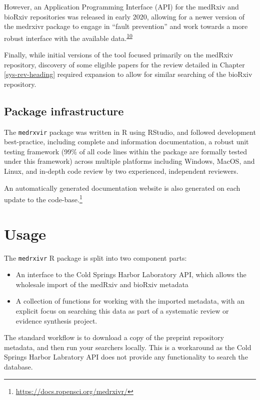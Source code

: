 \documentclass[a4paper, twoside]{templates/ociamthesis}
\providecommand{\tightlist}{%
  \setlength{\itemsep}{0pt}\setlength{\parskip}{0pt}}
\begin{document}
However, an Application Programming Interface (API) for the medRxiv and bioRxiv repositories was released in early 2020, allowing for a newer version of the medrxivr package to engage in ``fault prevention'' and work towards a more robust interface with the available data.\textsuperscript{\protect\hyperlink{ref-laprie1992}{10}}

Finally, while initial versions of the tool focused primarily on the medRxiv repository, discovery of some eligible papers for the review detailed in Chapter \ref{sys-rev-heading} required expansion to allow for similar searching of the bioRxiv repository.

\hypertarget{package-infrastructure}{%
\subsection{Package infrastructure}\label{package-infrastructure}}

The \texttt{medrxvir} package was written in R using RStudio, and followed development best-practice, including complete and information documentation, a robust unit testing framework (99\% of all code lines within the package are formally tested under this framework) across multiple platforms including Windows, MacOS, and Linux, and in-depth code review by two experienced, independent reviewers.

An automatically generated documentation website is also generated on each update to the code-base.\footnote{\url{https://docs.ropensci.org/medrxivr/}}

\hypertarget{usage}{%
\section{Usage}\label{usage}}

The \texttt{medrxivr} R package is split into two component parts:

\begin{itemize}
\tightlist
\item
  An interface to the Cold Springs Harbor Laboratory API, which allows the wholesale import of the medRxiv and bioRxiv metadata
\item
  A collection of functions for working with the imported metadata, with an explicit focus on searching this data as part of a systematic review or evidence synthesis project.
\end{itemize}

The standard workflow is to download a copy of the preprint repository metadata, and then run your searchers locally. This is a workaround as the Cold Springs Harbor Labratory API does not provide any functionality to search the database.
\end{document}
